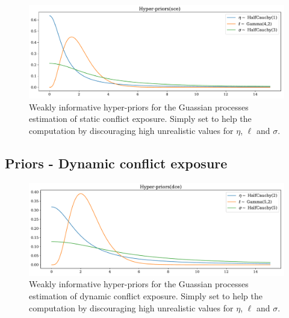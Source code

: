 \documentclass[a4paper]{article}
\begin{document}
\begin{figure}[!htb]
	\centering
	\includegraphics[scale=0.47]{Hyper-priors(sce).pdf}
    \caption{\footnotesize{Weakly informative hyper-priors for the Guassian processes estimation of static conflict exposure. Simply set to help the computation by discouraging high unrealistic values for $\eta$, $\ell$ and $\sigma$.}}\label{roc_curves}
\end{figure}

\subsection{Priors - Dynamic conflict exposure}\label{dcePrior}

\begin{figure}[!htb]
	\centering
	\includegraphics[scale=0.47]{Hyper-priors(dce).pdf}
    \caption{\footnotesize{Weakly informative hyper-priors for the Guassian processes estimation of dynamic conflict exposure. Simply set to help the computation by discouraging high unrealistic values for $\eta$, $\ell$ and $\sigma$.}}\label{roc_curves}
\end{figure}

\end{document}
